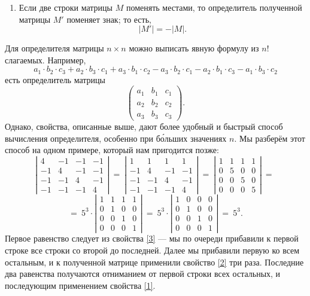 \documentclass{article}
\begin{document}
\begin{enumerate}[resume]
 \item 
Если две строки матрицы $M$ поменять местами, то определитель полученной матрицы $M'$ поменяет знак; то есть,
\[|M'|=-|M|.\]
\end{enumerate}


Для определителя матрицы $n\times n$ можно выписать явную формулу из $n!$ слагаемых. 
Например, 
\[
a_1{\cdot} b_2{\cdot} c_3+a_2{\cdot} b_3{\cdot} c_1+a_3{\cdot} b_1{\cdot} c_2-a_3{\cdot} b_2{\cdot} c_1-a_2{\cdot} b_1{\cdot} c_3-a_1{\cdot} b_3{\cdot} c_2\]
есть определитель матрицы
\[\left(
\begin{matrix}
a_1&b_1&c_1
\\
a_2&b_2&c_2
\\
a_3&b_3&c_3
\end{matrix}
\right).\]
Однако, свойства, описанные выше, дают более удобный и быстрый способ вычисления определителя, особенно при б\'{о}льших значениях $n$.
Мы разберём этот способ на одном примере, который нам пригодится позже:
\[\left|
\begin{matrix}
4&-1&-1&-1
\\
-1&4&-1&-1
\\
-1&-1&4&-1
\\
-1&-1&-1&4
\end{matrix}
\right|
\ 
=
\ 
\left|
\begin{matrix}
1&1&1&1
\\
-1&4&-1&-1
\\
-1&-1&4&-1
\\
-1&-1&-1&4
\end{matrix}
\right|
\ 
=
\ 
\left|
\begin{matrix}
1&1&1&1
\\
0&5&0&0
\\
0&0&5&0
\\
0&0&0&5
\end{matrix}
\right|
\ 
=
\ 
\]
\[
=\ 
5^3\cdot
\left|
\begin{matrix}
1&1&1&1
\\
0&1&0&0
\\
0&0&1&0
\\
0&0&0&1
\end{matrix}
\right|\ =\ 
5^3\cdot\left|
\begin{matrix}
1&0&0&0
\\
0&1&0&0
\\
0&0&1&0
\\
0&0&0&1
\end{matrix}
\right|
\ =\ 5^3.\]
Первое равенство следует из свойства \ref{3} --- мы по очереди прибавили к первой строке все строки со второй до последней. 
Далее мы прибавили первую ко всем остальным, и к полученной матрице применили свойство \ref{2} три раза.
Последние два равенства получаются отниманием от первой строки всех остальных, и последующим применением свойства \ref{1}.
\end{document}

